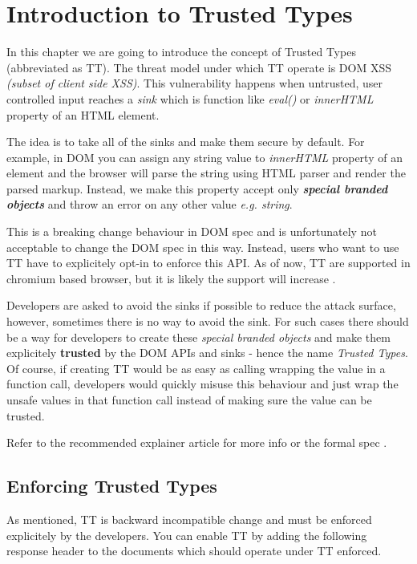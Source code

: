 \chapter{Introduction to Trusted Types}

\label{chapter:intro-tt} %

In this chapter we are going to introduce the concept of Trusted Types (abbreviated as TT). The
threat model under which TT operate is DOM XSS \emph{(subset of client side XSS)}. This
vulnerability happens when untrusted, user controlled input reaches a \emph{sink} which is function
like \emph{eval()} or \emph{innerHTML} property of an HTML element.

The idea is to take all of the sinks and make them secure by default. For example, in DOM you can
assign any string value to \emph{innerHTML} property of an element and the browser will parse the
string using HTML parser and render the parsed markup. Instead, we make this property accept only
\emph{\textbf{special branded objects}} and throw an error on any other value \emph{e.g. string}.

This is a breaking change behaviour in DOM spec and is unfortunately not acceptable to change the
DOM spec in this way. Instead, users who want to use TT have to explicitely opt-in to enforce this
API. As of now, TT are supported in chromium based browser, but it is likely the support will
increase \cite{tt_compatibility}.

Developers are asked to avoid the sinks if possible to reduce the attack surface, however, sometimes
there is no way to avoid the sink. For such cases there should be a way for developers to create
these \emph{special branded objects} and make them explicitely \textbf{trusted} by the DOM APIs and
sinks - hence the name \emph{Trusted Types}. Of course, if creating TT would be as easy as calling
wrapping the value in a function call, developers would quickly misuse this behaviour and just wrap
the unsafe values in that function call instead of making sure the value can be trusted.

Refer to the recommended explainer article for more info \cite{trusted_types_into} or the formal
spec \cite{tt_spec}.

\section{Enforcing Trusted Types}

As mentioned, TT is backward incompatible change and must be enforced explicitely by the developers.
You can enable TT by adding the following response header to the documents which should operate
under TT enforced.


